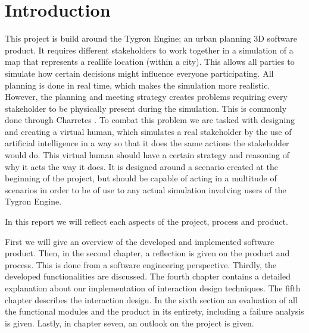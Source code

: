 \section{Introduction}

This project is build around the Tygron Engine; an urban planning 3D software product. It requires different stakeholders to work together in a simulation of a map that represents a reallife location (within a city). This allows all parties to simulate how certain decisions might influence everyone participating. All planning is done in real time, which makes the simulation more realistic. However, the planning and meeting strategy creates problems requiring every stakeholder to be physically present during the simulation. This is commonly done through Charretes \cite{Todd13}. To combat this problem we are tasked with designing and creating a virtual human, which simulates a real stakeholder by the use of artificial intelligence in a way so that it does the same actions the stakeholder would do. This virtual human should have a certain strategy and reasoning of why it acts the way it does. It is designed around a scenario created at the beginning of the project, but should be capable of acting in a multitude of scenarios in order to be of use to any actual simulation involving users of the Tygron Engine.

In this report we will reflect each aspects of the project, process and product.

First we will give an overview of the developed and implemented software product. Then, in the second chapter, a reflection is given on the product and process. This is done from a software engineering perspective. Thirdly, the developed functionalities are discussed. The fourth chapter contains a detailed explanation about our implementation of interaction design techniques. The fifth chapter describes the interaction design. In the sixth section an evaluation of all the functional modules and the product in its entirety, including a failure analysis is given. Lastly, in chapter seven, an outlook on the project is given.
\newpage

